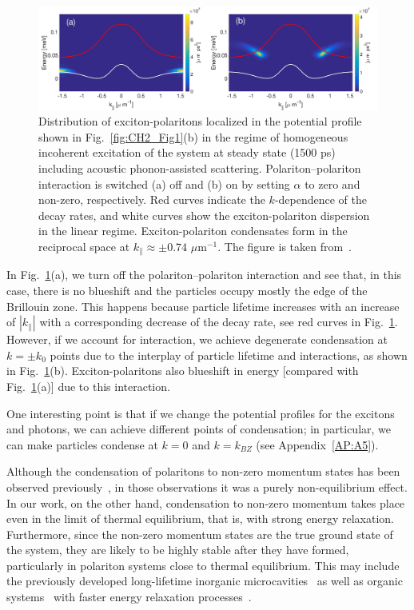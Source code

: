%
%
%
\begin{figure}[ht]
\centering
	\includegraphics[width=0.99\linewidth]{Fig/Ch2/Fig3.jpg}
	\caption[Exciton-polariton spectra]{Distribution of exciton-polaritons localized in the potential profile shown in Fig.~\ref{fig:CH2_Fig1}(b) in the regime of homogeneous incoherent excitation of the system at steady state (1500 ps) including acoustic phonon-assisted scattering.
	Polariton--polariton interaction is switched (a) off and (b) on by setting $\alpha$ to zero and non-zero, respectively.
Red curves indicate the $k$-dependence of the decay rates, and white curves show the exciton-polariton dispersion in the linear regime.
	Exciton-polariton condensates form in the reciprocal space at $k_\parallel\approx \pm 0.74$ $\mu$m$^{-1}$. The figure is taken from~\cite{Sun:2017ab}.}
\label{fig:CH2_Fig4}
\end{figure}
%
%
%

In Fig.~\ref{fig:CH2_Fig4}(a), we turn off the polariton--polariton interaction and see that, in this case, there is no blueshift and the particles occupy mostly the edge of the Brillouin zone. 
This happens because particle lifetime increases with an increase of $|k_{\parallel}|$ with a corresponding decrease of the decay rate, see red curves in Fig.~\ref{fig:CH2_Fig4}.
However, if we account for interaction, we achieve degenerate condensation at $k=\pm k_0$ points due to the interplay of particle lifetime and interactions, as shown in Fig.~\ref{fig:CH2_Fig4}(b). 
Exciton-polaritons also blueshift in energy [compared with Fig.~\ref{fig:CH2_Fig4}(a)] due to this interaction.

One interesting point is that if we change the potential profiles for the excitons and photons, we can achieve different points of condensation; in particular, we can make particles condense at $k=0$ and $k=k_{BZ}$ (see Appendix~\ref{AP:A5}).

Although the condensation of polaritons to non-zero momentum states has been observed previously~\cite{Liu:2015aa,Maragkou:2010aa,Kusudo:2013aa}, in those observations it was a purely non-equilibrium effect.
In our work, on the other hand, condensation to non-zero momentum takes place even in the limit of thermal equilibrium, that is, with strong energy relaxation. 
Furthermore, since the non-zero momentum states are the true ground state of the system, they are likely to be highly stable after they have formed, particularly in polariton systems close to thermal equilibrium. 
This may include the previously developed long-lifetime inorganic microcavities~\cite{Nelsen:2013aa} as well as organic systems~\cite{Kena-Cohen:2010aa} with faster energy relaxation processes~\cite{Lanty:2008aa}.

